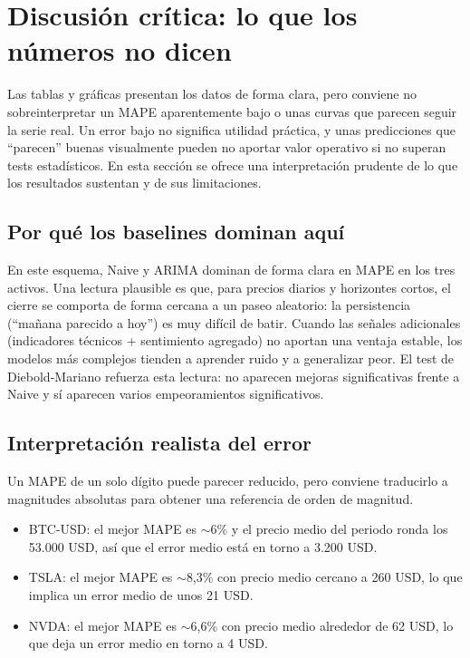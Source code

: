 
\section{Discusión crítica: lo que los números no dicen}

Las tablas y gráficas presentan los datos de forma clara, pero conviene no sobreinterpretar un MAPE aparentemente bajo o unas curvas que parecen seguir la serie real. Un error bajo no significa utilidad práctica, y unas predicciones que ``parecen'' buenas visualmente pueden no aportar valor operativo si no superan tests estadísticos. En esta sección se ofrece una interpretación prudente de lo que los resultados sustentan y de sus limitaciones.

\subsection{Por qué los baselines dominan aquí}

En este esquema, Naive y ARIMA dominan de forma clara en MAPE en los tres activos. Una lectura plausible es que, para precios diarios y horizontes cortos, el cierre se comporta de forma cercana a un paseo aleatorio: la persistencia (``mañana parecido a hoy'') es muy difícil de batir. Cuando las señales adicionales (indicadores técnicos + sentimiento agregado) no aportan una ventaja estable, los modelos más complejos tienden a aprender ruido y a generalizar peor. El test de Diebold-Mariano refuerza esta lectura: no aparecen mejoras significativas frente a Naive y sí aparecen varios empeoramientos significativos.

\subsection{Interpretación realista del error}

Un MAPE de un solo dígito puede parecer reducido, pero conviene traducirlo a magnitudes absolutas para obtener una referencia de orden de magnitud.

\begin{itemize}
    \item BTC-USD: el mejor MAPE es $\sim$6\% y el precio medio del periodo ronda los 53.000 USD, así que el error medio está en torno a 3.200 USD.
    \item TSLA: el mejor MAPE es $\sim$8,3\% con precio medio cercano a 260 USD, lo que implica un error medio de unos 21 USD.
    \item NVDA: el mejor MAPE es $\sim$6,6\% con precio medio alrededor de 62 USD, lo que deja un error medio en torno a 4 USD.
\end{itemize}


